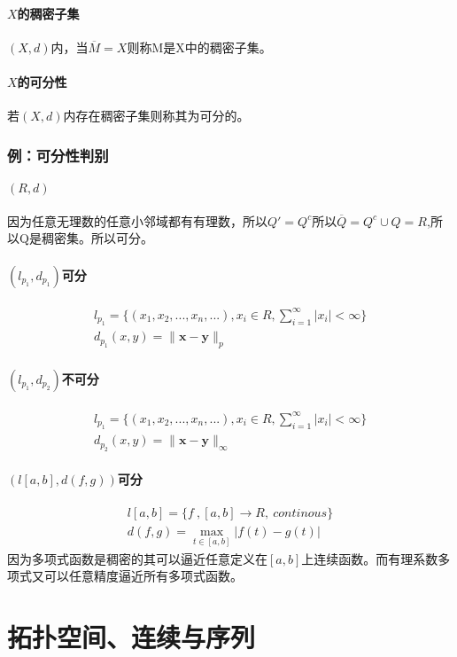 \documentclass[11pt]{article}
\begin{document}
\begin{CJK*}{UTF8}{gbsn}
\subsection{$X$的稠密子集}
$(X,d)$内，当$\overline{M}=X$则称M是X中的稠密子集。

\subsection{$X$的可分性}
若$(X,d)$内存在稠密子集则称其为可分的。
\section{例：可分性判别}

\subsection{$(R,d)$}
因为任意无理数的任意小邻域都有有理数，所以$Q'=Q^c$所以$\overline{Q}=Q^c\cup Q=R$,所以Q是稠密集。所以可分。
\subsection{$(l_{p_1},d_{p_1})$可分}
\begin{align*}
	l_{p_1}=\{(x_1,x_2,...,x_n,...),x_i\in R,\sum^{\infty}_{i=1}|x_i|<\infty\}\\
	d_{p_1}(x,y)=\|\bm x-\bm y\|_p
\end{align*}
\subsection{$(l_{p_1},d_{p_2})$不可分}
\begin{align*}
	l_{p_1}=\{(x_1,x_2,...,x_n,...),x_i\in R,\sum^{\infty}_{i=1}|x_i|<\infty\}\\
	d_{p_2}(x,y)=\|\bm x-\bm y\|_\infty
\end{align*}
\subsection{$(l[a,b],d(f,g))$可分}
\begin{align*}
	l[a,b]=\{f~,[a,b]\rightarrow R,~continous\}\\
	d(f,g)= \mathop{max}_{t\in [a,b]}|f(t)-g(t)|
\end{align*}
因为多项式函数是稠密的其可以逼近任意定义在$[a,b]$上连续函数。而有理系数多项式又可以任意精度逼近所有多项式函数。

\pagebreak
\part{拓扑空间、连续与序列}
\setcounter{section}{0}

\end{CJK*}
\end{document}
